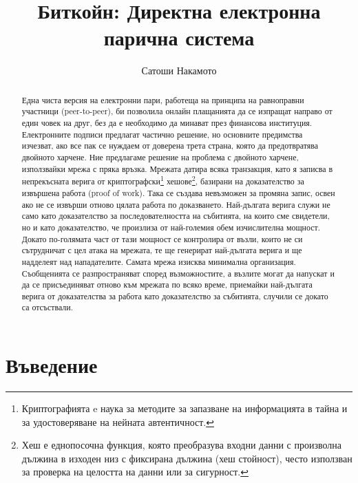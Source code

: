 \documentclass[11pt,a4paper]{article}
\title{\textbf{Биткойн: Директна електронна парична система}}
\author{Сатоши Накамото}
\date{}
\begin{document}
\maketitle

\begin{abstract}
Една чиста версия на електронни пари, работеща на принципа на равноправни участници (peer-to-peer), би позволила онлайн плащанията да се изпращат направо от един човек на друг, без да е необходимо да минават през финансова институция. Електронните подписи предлагат частично решение, но основните предимства изчезват, ако все пак се нуждаем от доверена трета страна, която да предотвратява двойното харчене. Ние предлагаме решение на проблема с двойното харчене, използвайки мрежа с пряка връзка. Мрежата датира всяка транзакция, като я записва в непрекъсната верига от криптографски\footnote{Криптографията e наука за методите за запазване на информацията в тайна и за удостоверяване на нейната автентичност.} хешове\footnote{Хеш е еднопосочна функция, която преобразува входни данни с произволна дължина в изходен низ с фиксирана дължина (хеш стойност), често използван за проверка на целостта на данни или за сигурност.}, базирани на доказателство за извършена работа (proof of work). Така се създава невъзможен за промяна запис, освен ако не се извърши отново цялата работа по доказването. Най-дългата верига служи не само като доказателство за последователността на събитията, на които сме свидетели, но и като доказателство, че произлиза от най-големия обем изчислителна мощност. Докато по-голямата част от тази мощност се контролира от възли, които не си сътрудничат с цел атака на мрежата, те ще генерират най-дългата верига и ще надделеят над нападателите. Самата мрежа изисква минимална организация. Съобщенията се разпространяват според възможностите, а възлите могат да напускат и да се присъединяват отново към мрежата по всяко време, приемайки най-дългата верига от доказателства за работа като доказателство за събитията, случили се докато са отсъствали.
\end{abstract}

\section{Въведение}
\end{document}
